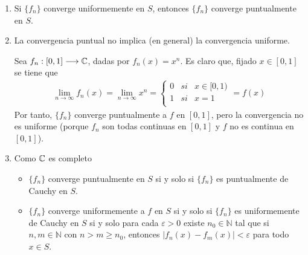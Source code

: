 \begin{obs}
    \begin{enumerate}
        \item Si $\{f_n\}$ converge uniformemente en $S$, entonces $\{f_n\}$ converge puntualmente en $S$.
        \item La convergencia puntual no implica (en general) la convergencia uniforme.
              \begin{ejemplo}
                  Sea $f_n : [0,1] \longrightarrow \mathbb{C}$, dadas por $f_n(x) = x^n$. Es claro que, fijado $x \in [0,1]$ se tiene que
                  \begin{align*}
                      \lim_{n \to \infty}{f_n(x)} = \lim_{n \to \infty}{x^n} = \left\{ \begin{array}{lcc}
                                                                                           0 & si & x \in [0,1) \\
                                                                                           1 & si & x = 1       \\
                                                                                       \end{array}
                      \right. = f(x)
                  \end{align*}
                  Por tanto, $\{f_n\}$ converge puntualmente a  $f$ en $[0,1]$, pero la convergencia no es uniforme (porque $f_n$ son todas continuas en $[0,1]$ y $f$ no es continua en $[0,1]$).
              \end{ejemplo}
        \item Como $\mathbb{C}$ es completo
              \begin{itemize}
                  \item $\{f_n\}$ converge puntualmente en $S$ si y solo si $\{f_n\}$ es puntualmente de Cauchy en $S$.
                  \item $\{f_n\}$ converge uniformemente a $f$ en $S$ si y solo si $\{f_n\}$ es uniformemente de Cauchy en $S$ si y solo para cada $\varepsilon > 0$ existe $n_0 \in \mathbb{N}$ tal que si $n,m \in \mathbb{N}$ con $n > m  \ge n_0$, entonces $|f_n(x) - f_m(x)| < \varepsilon$ para todo $x \in S$.
              \end{itemize}
    \end{enumerate}
\end{obs}

